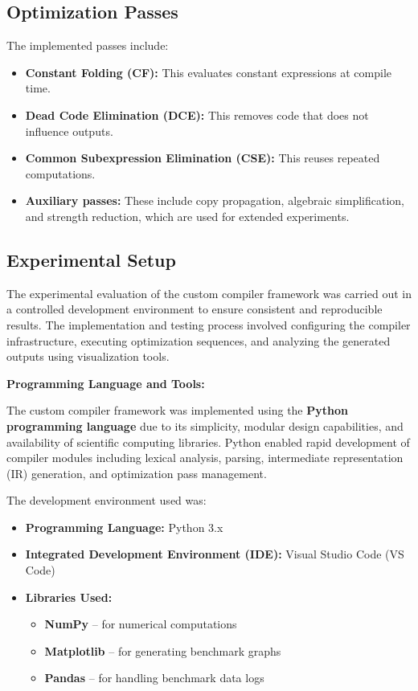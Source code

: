 \documentclass[conference]{IEEEtran}
\begin{document}
\subsection{Optimization Passes}

The implemented passes include:

\begin{itemize}
    \item \textbf{Constant Folding (CF):} This evaluates constant expressions at compile time.
    \item \textbf{Dead Code Elimination (DCE):} This removes code that does not influence outputs.
    \item \textbf{Common Subexpression Elimination (CSE):} This reuses repeated computations.
    \item \textbf{Auxiliary passes:} These include copy propagation, algebraic simplification, and strength reduction, which are used for extended experiments.
\end{itemize}

\subsection{Experimental Setup}

The experimental evaluation of the custom compiler framework was carried out in a controlled development environment to ensure consistent and reproducible results. The implementation and testing process involved configuring the compiler infrastructure, executing optimization sequences, and analyzing the generated outputs using visualization tools.

\textbf{Programming Language and Tools:}

The custom compiler framework was implemented using the \textbf{Python programming language} due to its simplicity, modular design capabilities, and availability of scientific computing libraries. Python enabled rapid development of compiler modules including lexical analysis, parsing, intermediate representation (IR) generation, and optimization pass management.

The development environment used was:

\begin{itemize}

\item \textbf{Programming Language:} Python 3.x  
\item \textbf{Integrated Development Environment (IDE):} Visual Studio Code (VS Code)  
\item \textbf{Libraries Used:}
    \begin{itemize}
        \item \textbf{NumPy} – for numerical computations
        \item \textbf{Matplotlib} – for generating benchmark graphs
        \item \textbf{Pandas} – for handling benchmark data logs
    \end{itemize}

\end{itemize}
\end{document}
